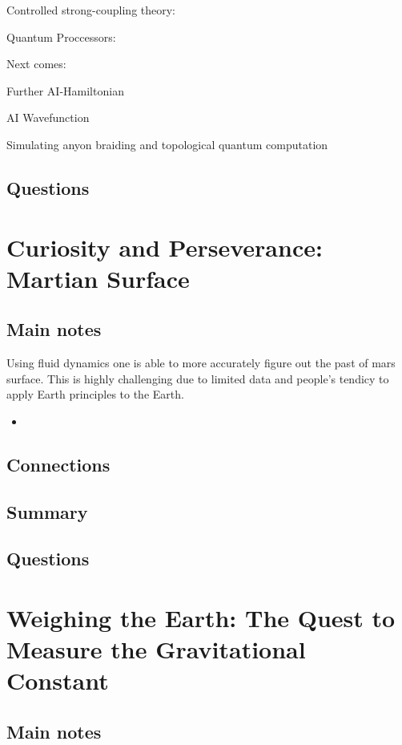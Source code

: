 Controlled strong-coupling theory:

Quantum Proccessors:


Next comes:

Further AI-Hamiltonian

AI Wavefunction

Simulating anyon braiding and topological quantum computation

\subsection{Questions}




\section{Curiosity and Perseverance: Martian Surface}
\subsection{Main notes}

Using fluid dynamics one is able to more accurately figure out the past of mars surface. This is highly challenging due to limited data and people's tendicy to apply Earth principles to the Earth.

\begin{itemize}
	\item
\end{itemize}


\subsection{Connections}


\subsection{Summary}


\subsection{Questions}


\section{Weighing the Earth: The Quest to Measure the Gravitational Constant}
\subsection{Main notes}

